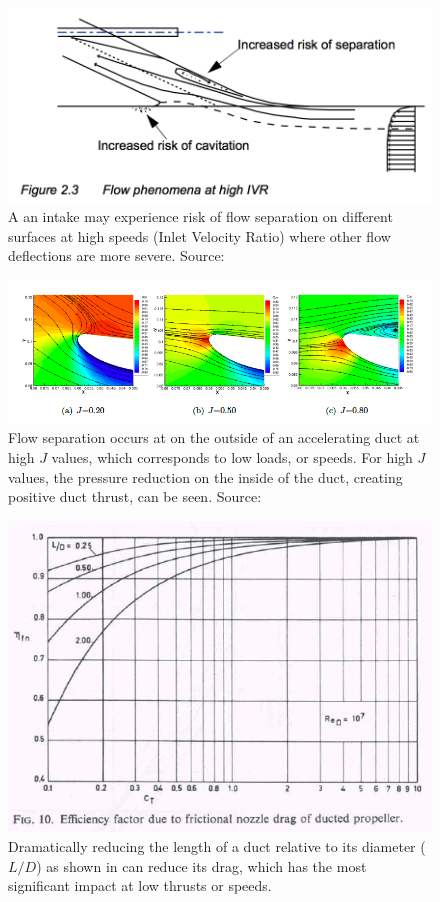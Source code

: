 \documentclass{article}\usepackage[]{graphicx}\usepackage[]{color}
\begin{document}
\begin{figure}
\includegraphics[width=\textwidth]{HighIVR.png}
\caption{A an intake may experience risk of flow separation on different surfaces at high speeds (Inlet Velocity Ratio) where other flow deflections are more severe. Source: \cite{bulten2006numerical}}
\label{fig:HighIVR.png}
\end{figure}

\begin{figure}
\includegraphics[width=\textwidth]{DuctSeparation.png}
\caption{Flow separation occurs at on the outside of an accelerating duct at high $J$ values, which corresponds to low loads, or speeds. For high $J$ values, the pressure reduction on the inside of the duct, creating positive duct thrust, can be seen. Source: \cite[73]{willemsen2013}}
\label{fig:DuctSeparation.png}
\end{figure}

\begin{figure}
\includegraphics[width=\textwidth]{NozzleDrag.png}
\caption{Dramatically reducing the length of a duct relative to its diameter ($L/D$) as shown in \cite{oosterveld1970} can reduce its drag, which has the most significant impact at low thrusts or speeds.}
\label{fig:NozzleDrag.png}
\end{figure}
\end{document}
